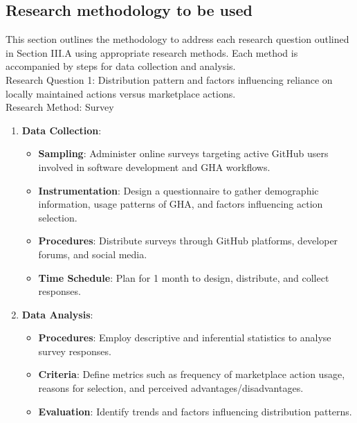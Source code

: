 \documentclass[conference]{IEEEtran}
\begin{document}
\subsection{Research methodology to be used}

This section outlines the methodology to address each research question outlined in Section III.A using appropriate research methods. Each method is accompanied by steps for data collection and analysis.\\

Research Question 1: Distribution pattern and factors influencing reliance on locally maintained actions versus marketplace actions.\\

Research Method: Survey\\

\begin{enumerate}
    \item \textbf{Data Collection}:\\
    \begin{itemize}
        \item \textbf{Sampling}: Administer online surveys targeting active GitHub users involved in software development and GHA workflows.
        \item \textbf{Instrumentation}: Design a questionnaire to gather demographic information, usage patterns of GHA, and factors influencing action selection.
        \item \textbf{Procedures}: Distribute surveys through GitHub platforms, developer forums, and social media.
        \item \textbf{Time Schedule}: Plan for 1 month to design, distribute, and collect responses.\\
    \end{itemize}
    
    \item \textbf{Data Analysis}:\\
    \begin{itemize}
        \item \textbf{Procedures}: Employ descriptive and inferential statistics to analyse survey responses.
        \item \textbf{Criteria}: Define metrics such as frequency of marketplace action usage, reasons for selection, and perceived advantages/disadvantages.
        \item \textbf{Evaluation}: Identify trends and factors influencing distribution patterns.\\
    \end{itemize}
\end{enumerate}
\end{document}

